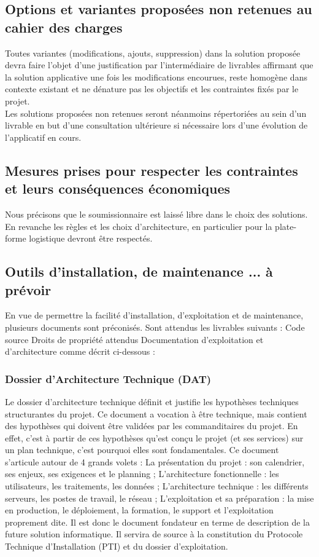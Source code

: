 \documentclass[11pt,fleqn]{book} %
\begin{document}
\subsection{Options et variantes proposées non retenues au cahier des charges}
Toutes variantes (modifications, ajouts, suppression) dans la solution proposée devra faire l'objet d'une justification par l'intermédiaire de livrables affirmant que la solution applicative une fois les modifications encourues, reste homogène dans contexte existant et ne dénature pas les objectifs et les contraintes fixés par le projet.
\\
Les solutions proposées non retenues seront néanmoins répertoriées au sein d'un livrable en but d'une consultation ultérieure si nécessaire lors d'une évolution de l'applicatif en cours.

\subsection{Mesures prises pour respecter les contraintes et leurs conséquences économiques}
Nous précisons que le soumissionnaire est laissé libre dans le choix des solutions. En revanche les règles et les choix d'architecture, en particulier pour la plate-forme logistique devront être respectés.

\subsection{Outils d'installation, de maintenance ... à prévoir}
En vue de permettre la facilité d'installation, d'exploitation et de maintenance, plusieurs documents sont préconisés.
Sont attendus les livrables suivants :
Code source
Droits de propriété attendus
Documentation d'exploitation et d'architecture comme décrit ci-dessous :

\subsubsection{Dossier d'Architecture Technique (DAT)}
Le dossier d'architecture technique définit et justifie les hypothèses techniques structurantes du projet. Ce document a vocation à être technique, mais contient des hypothèses qui doivent être validées par les commanditaires du projet. En effet, c'est à partir de ces hypothèses qu'est conçu le projet (et ses services) sur un plan technique, c'est pourquoi elles sont fondamentales.
Ce document s'articule autour de 4 grands volets :
La présentation du projet : son calendrier, ses enjeux, ses exigences et le planning ;
L'architecture fonctionnelle : les utilisateurs, les traitements, les données ;
L'architecture technique : les différents serveurs, les postes de travail, le réseau ;
L'exploitation et sa préparation : la mise en production, le déploiement, la formation, le support et l'exploitation proprement dite.
Il est donc le document fondateur en terme de description de la future solution informatique. Il servira de source à la constitution du Protocole Technique d'Installation (PTI) et du dossier d'exploitation.
\end{document}
